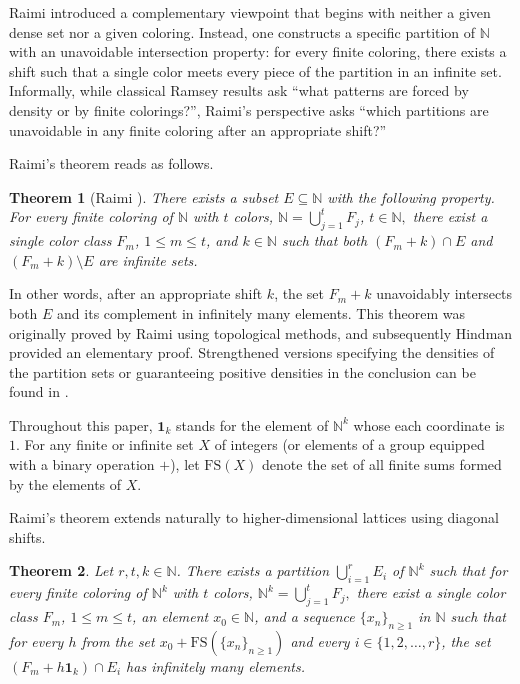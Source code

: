 \documentclass[11pt]{article}
\newtheorem{theorem}{Theorem}[section]
\theoremstyle{definition}
\begin{document}
Raimi \cite{Raimi} introduced a complementary viewpoint that begins with neither a given dense set nor a given coloring. Instead, one constructs a specific partition of $\mathbb{N}$ with an unavoidable intersection property: for every finite coloring, there exists a shift such that a single color meets every piece of the partition in an infinite set. Informally, while classical Ramsey results ask ``what patterns are forced by density or by finite colorings?'', Raimi's perspective asks ``which partitions are unavoidable in any finite coloring after an appropriate shift?''

Raimi's theorem reads as follows.

\begin{theorem}[Raimi \cite{Raimi}]\label{raimithm}
There exists a subset $E\subseteq \mathbb{N}$ with the following property. For every finite coloring of $\mathbb{N}$ with $t$ colors, $\mathbb{N}=\bigcup_{j=1}^t F_j$, $t\in\mathbb{N},$ there exist a single color class $F_m$, $1\le m\le t$, and $k\in \mathbb{N}$ such that both $(F_m+k)\cap E$ and $(F_m+k)\setminus E$ are infinite sets.
\end{theorem}

In other words, after an appropriate shift $k$, the set $F_m + k$ unavoidably intersects both $E$ and its complement in infinitely many elements. This theorem was originally proved by Raimi using topological methods, and subsequently Hindman \cite{HM} provided an elementary proof. Strengthened versions specifying the densities of the partition sets or guaranteeing positive densities in the conclusion can be found in \cite{Bergelson2, NH}.

Throughout this paper, $\mathbf{1}_k$ stands for the element of $\mathbb{N}^k$ whose each coordinate is $1$. For any finite or infinite set $X$ of integers (or elements of a group equipped with a binary operation $+$), let $\mathrm{FS}(X)$ denote the set of all finite sums formed by the elements of $X$.









Raimi's theorem extends naturally to higher-dimensional lattices using diagonal shifts. 

\begin{theorem}\label{HD}
Let $r, t, k\in\mathbb{N}$. There exists a partition
$\bigcup_{i=1}^rE_i$ of $\mathbb{N}^k$ such that 
for every finite coloring of $\mathbb{N}^k$ with $t$ colors,
$
\mathbb{N}^k = \bigcup_{j=1}^t F_j,
$ there exist a single color class $F_m$, $1\le m\le t$, an element $x_0\in \mathbb{N}$, and a sequence $\{x_n\}_{n\ge 1}$
in $\mathbb{N}$ such that for every $h$ from the set $x_0+
\mathrm{FS}(\{x_n\}_{n\ge 1})$ and every $i\in\{1,2,
\ldots,r\}$, the set $(F_m+h\mathbf{1}_k)\cap E_i$ has infinitely many elements.
\end{theorem}
\end{document}
